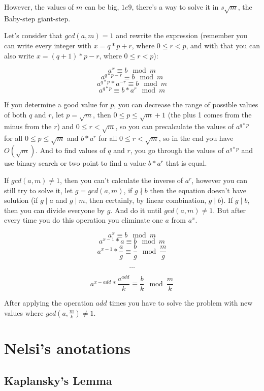     However, the values of $m$ can be big, $1e9$, there's a way to solve it in $s\sqrt{m}$, the Baby-step giant-step.

    Let's consider that $gcd(a,m) = 1$ and rewrite the expression (remember you can write every integer with $x = q*p + r$, where $0 \leq r < p$, and with that you can also write $x = (q+1)*p -r$, where $0 \leq r < p$):

    $$
    a^x \equiv b \mod{m} 
    $$
    $$
    a^{q*p-r} \equiv b \mod{m}
    $$
    $$
    a^{q*p}*a^{-r} \equiv b \mod{m}
    $$
    $$
    a^{q*p} \equiv b*a^r \mod{m}
    $$

    If you determine a good value for $p$, you can decrease the range of possible values of both $q$ and $r$, let $p = \sqrt{m}$, then $0 \leq p \leq \sqrt{m}+1$ (the plus 1 comes from the minus from the $r$) and $0 \leq r < \sqrt{m}$, so you can precalculate the values of $a^{q*p}$ for all $0 \leq p \leq \sqrt{m}$ and $b*a^{r}$ for all $0 \leq r < \sqrt{m}$, so in the end you have $O(\sqrt{m})$. And to find values of $q$ and $r$, you go through the values of $a^{q*p}$ and use binary search or two point to find a value $b*a^r$ that is equal.

    If $gcd(a,m) \neq 1$, then you can't calculate the inverse of $a^r$, however you can still try to solve it, let $g = gcd(a,m)$, if $g \nmid b$ then the equation doesn't have solution (if $g \mid a$ and $g \mid m$, then certainly, by linear combination, $g \mid b$). If $g \mid b$, then you can divide everyone by $g$. And do it until $gcd(a,m) \neq 1$. But after every time you do this operation you eliminate one $a$ from $a^x$.

    $$a^x \equiv b \mod{m}$$
    $$a^{x-1}*a \equiv b \mod{m}$$
    $$a^{x-1}*\frac{a}{g} \equiv \frac{b}{g} \mod{\frac{m}{g}}$$
    
    $$\dots$$
    
    $$a^{x-add}*\frac{a^{add}}{k} \equiv \frac{b}{k} \mod{\frac{m}{k}}$$

    After applying the operation $add$ times you have to solve the problem with new values where $gcd(a,\frac{m}{k}) \neq 1$.

        
        

    \section{Nelsi's anotations}
        \subsection{Kaplansky's Lemma} 
